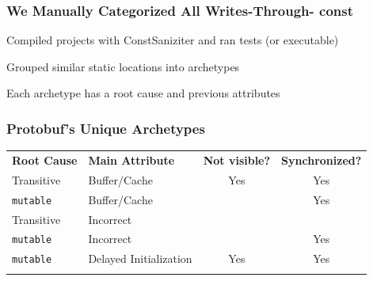 \documentclass[aspectratio=169]{beamer}
\newcommand{\const}{{\color{blue} \bfseries \ttfamily const}}
\begin{document}
  \begin{frame}
    \frametitle{We Manually Categorized All Writes-Through-\const{}}
    \Large
    Compiled projects with ConstSaniziter and ran tests (or executable)

    \vspace{1em}
    Grouped similar static locations into archetypes

    \vspace{1em}
    Each archetype has a root cause and previous attributes
  \end{frame}

  \begin{frame}
    \frametitle{Protobuf's Unique Archetypes}
    \Large
    \begin{tabular}{p{2.65cm} p{4cm} c c}
      \textbf{Root Cause} & \textbf{Main Attribute}
      & \textbf{Not visible?} & \textbf{Synchronized?} \\

      Transitive & Buffer/Cache & Yes & Yes \\
      \texttt{mutable} & Buffer/Cache &   & Yes \\
      Transitive & Incorrect &   &   \\
      \texttt{mutable} & Incorrect &   & Yes \\
      \texttt{mutable} & Delayed Initialization & Yes & Yes \\
      & & & \\
    \end{tabular}
  \end{frame}
\end{document}
